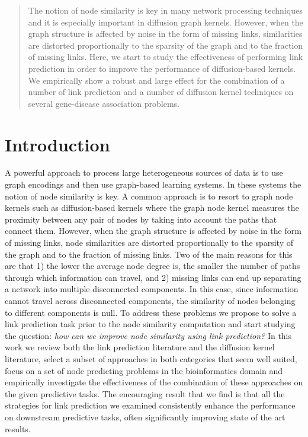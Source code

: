 
\begin{abstract}

The notion of node similarity is key in many network processing techniques and
it is especially important in diffusion graph kernels. However, when the graph
structure is affected by noise in the form of missing links, similarities are
distorted  proportionally to the sparsity of the graph and to the fraction of
missing links. Here, we start to study the effectiveness of performing link
prediction  in order to improve the performance of diffusion-based kernels. We
empirically show a robust and large effect for the combination of a number of
link prediction and a number of diffusion kernel techniques on several
gene-disease association problems.

\end{abstract}


\section{Introduction}

A powerful approach to process large heterogeneous sources of data is to use
graph encodings \cite{proceeding1} \cite{jour1} and then use graph-based
learning systems. In these systems the notion of node similarity is key. A
common approach is to resort to graph node kernels such as diffusion-based
kernels \cite{proceeding2} where the graph node kernel measures the proximity
between any pair of nodes by taking into account the paths that connect them.
However, when the graph structure is affected by noise in the form of missing
links, node similarities are distorted  proportionally to the sparsity of the
graph and to the fraction of missing links. Two of the main reasons for this
are that 1) the lower the average node degree is, the smaller the number of
paths through which information can travel, and 2) missing links can end up
separating a network into multiple disconnected components. In this case,
since  information cannot travel across disconnected components, the
similarity of nodes belonging to different components is null. To address
these problems we propose to solve a link prediction task prior to the node
similarity computation and start studying the question: {\em how can we
improve node similarity using link prediction?} In this work we review both
the link prediction literature and the diffusion kernel literature, select a
subset of approaches in both categories that seem well suited, focus on a set
of node predicting problems in the bioinformatics domain and empirically
investigate the effectiveness of the combination of these approaches on the given
predictive tasks. The encouraging result that we find is that all the
strategies for link prediction we examined consistently enhance the
performance on downstream predictive tasks, often significantly improving
state of the art results.
